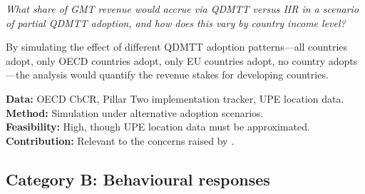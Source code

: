 \documentclass[12pt,a4paper]{article}
\begin{document}
\begin{description}[style=nextline,leftmargin=2cm]
\item[A3. QDMTT versus IIR revenue allocation.]
\emph{What share of GMT revenue would accrue via QDMTT versus IIR in a scenario of partial QDMTT adoption, and how does this vary by country income level?}

By simulating the effect of different QDMTT adoption patterns---all countries adopt, only OECD countries adopt, only EU countries adopt, no country adopts---the analysis would quantify the revenue stakes for developing countries.

\textbf{Data:} OECD CbCR, Pillar Two implementation tracker, UPE location data.\\
\textbf{Method:} Simulation under alternative adoption scenarios.\\
\textbf{Feasibility:} High, though UPE location data must be approximated.\\
\textbf{Contribution:} Relevant to the concerns raised by \textcite{vantriet2025}.

\end{description}

\subsection{Category B: Behavioural responses}
\end{document}
